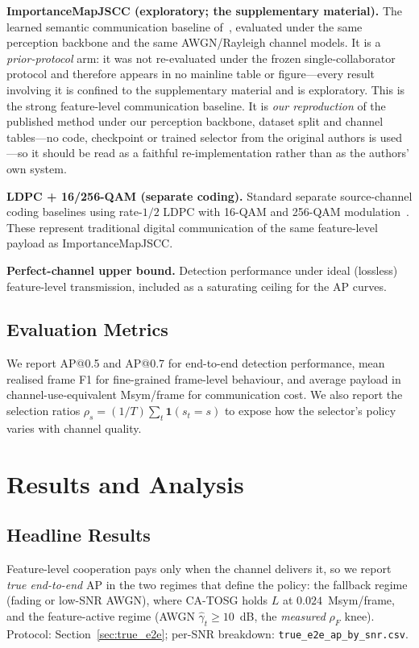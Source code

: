 \documentclass[journal]{IEEEtran}
\newcommand{\method}{CA-TOSG}
\begin{document}
\textbf{ImportanceMapJSCC (exploratory; the supplementary material).} The learned semantic communication baseline of~\cite{sheng2024importance}, evaluated under the same perception backbone and the same AWGN/Rayleigh channel models. It is a \emph{prior-protocol} arm: it was not re-evaluated under the frozen single-collaborator protocol and therefore appears in no mainline table or figure---every result involving it is confined to the supplementary material and is exploratory. This is the strong feature-level communication baseline. It is \emph{our reproduction} of the published method under our perception backbone, dataset split and channel tables---no code, checkpoint or trained selector from the original authors is used---so it should be read as a faithful re-implementation rather than as the authors' own system.

\textbf{LDPC + 16/256-QAM (separate coding).} Standard separate source-channel coding baselines using rate-$1/2$ LDPC with 16-QAM and 256-QAM modulation~\cite{ieee80211bd}. These represent traditional digital communication of the same feature-level payload as ImportanceMapJSCC.

\textbf{Perfect-channel upper bound.} Detection performance under ideal (lossless) feature-level transmission, included as a saturating ceiling for the AP curves.

\subsection{Evaluation Metrics}

We report AP@0.5 and AP@0.7 for end-to-end detection performance, mean realised frame F1 for fine-grained frame-level behaviour, and average payload in channel-use-equivalent Msym/frame for communication cost. We also report the selection ratios $\rho_s = (1/T)\sum_t \mathbf{1}(s_t=s)$ to expose how the selector's policy varies with channel quality.

\section{Results and Analysis}

\subsection{Headline Results}\label{sec:headline}

Feature-level cooperation pays only when the channel delivers it, so we report \emph{true end-to-end} AP in the two regimes that define the policy: the fallback regime (fading or low-SNR AWGN), where \method{} holds $L$ at $0.024$~Msym/frame, and the feature-active regime (AWGN $\hat\gamma_t \ge 10$~dB, the \emph{measured} $\rho_F$ knee). Protocol: Section~\ref{sec:true_e2e}; per-SNR breakdown: \texttt{true\_e2e\_ap\_by\_snr.csv}.
\end{document}
